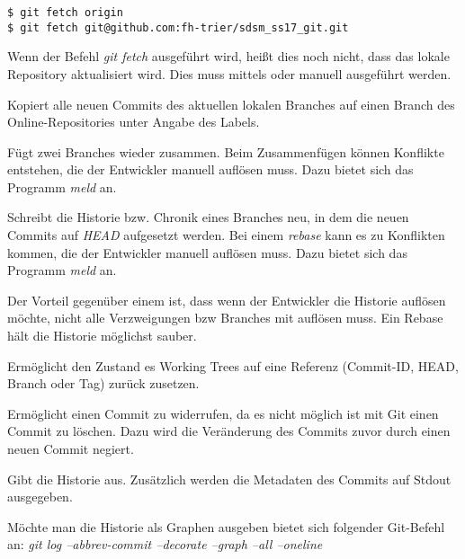 \begin{verbatim}
$ git fetch origin
$ git fetch git@github.com:fh-trier/sdsm_ss17_git.git
\end{verbatim}

\begin{info-popup}
  Wenn der Befehl \textit{git fetch} ausgeführt wird, heißt dies noch nicht, dass das lokale Repository aktualisiert wird. Dies muss mittels \textit{} oder \textit{} manuell ausgeführt werden.
\end{info-popup}

\label{sec:git-commands.advanced.push}
Kopiert alle neuen Commits des aktuellen lokalen Branches auf einen Branch des Online-Repositories unter Angabe des Labels.

\label{sec:git-commands.advanced.merge}
Fügt zwei Branches wieder zusammen. Beim Zusammenfügen können Konflikte entstehen, die der Entwickler manuell auflösen muss. Dazu bietet sich das Programm \textit{meld} an.

\label{sec:git-commands.advanced.rebase}
Schreibt die Historie bzw. Chronik eines Branches neu, in dem die neuen Commits auf \textit{HEAD} aufgesetzt werden. Bei einem \textit{rebase} kann es zu Konflikten kommen, die der Entwickler manuell auflösen muss. Dazu bietet sich das Programm \textit{meld} an.

Der Vorteil gegenüber einem \textit{} ist, dass wenn der Entwickler die Historie auflösen möchte, nicht alle Verzweigungen bzw Branches mit auflösen muss. Ein Rebase hält die Historie möglichst sauber.

\label{sec:git-commands.advanced.reset}
Ermöglicht den Zustand es Working Trees auf eine Referenz (Commit-ID, HEAD, Branch oder Tag) zurück zusetzen.

\label{sec:git-commands.advanced.revert}
Ermöglicht einen Commit zu widerrufen, da es nicht möglich ist mit Git einen Commit zu löschen. Dazu wird die Veränderung des Commits zuvor durch einen neuen Commit negiert.

\label{sec:git-commands.advanced.log}
Gibt die Historie aus. Zusätzlich werden die Metadaten des Commits auf Stdout ausgegeben.

\begin{info-popup}
  Möchte man die Historie als Graphen ausgeben bietet sich folgender Git-Befehl an: \textit{git log --abbrev-commit --decorate --graph --all --oneline}
\end{info-popup}

